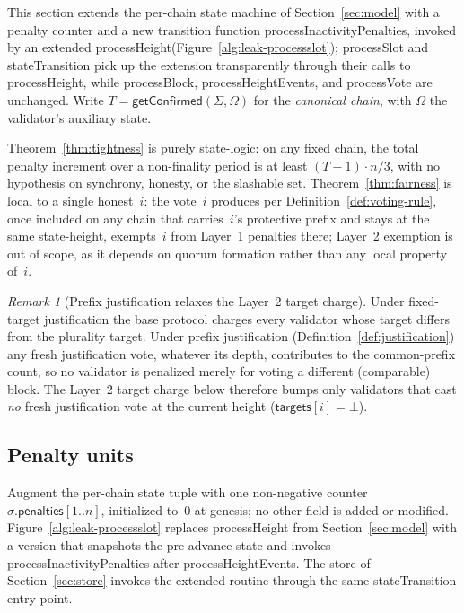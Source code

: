 \ifx\litemode\undefined\documentclass{article}\fi
\newcommand{\targets}{\mathsf{targets}}
\newcommand{\penalties}{\mathsf{penalties}}
\newcommand{\stateTransition}{\textsf{stateTransition}\xspace}
\newcommand{\processSlot}{\textsf{processSlot}\xspace}
\newcommand{\processBlock}{\textsf{processBlock}\xspace}
\newcommand{\processHeight}{\textsf{processHeight}\xspace}
\newcommand{\processHeightEvents}{\textsf{processHeightEvents}\xspace}
\newcommand{\processVote}{\textsf{processVote}\xspace}
\newcommand{\processInactivityPenalties}{\textsf{processInactivityPenalties}\xspace}
\newcommand{\getConfirmed}{\textsf{getConfirmed}\xspace}
\theoremstyle{plain}
\theoremstyle{definition}
\theoremstyle{remark}
\newtheorem{remark}[theorem]{Remark}
\begin{document}
This section extends the per-chain state machine of Section~\ref{sec:model} with a penalty counter and a new transition function \processInactivityPenalties, invoked by an extended \processHeight (Figure~\ref{alg:leak-processslot}); \processSlot and \stateTransition pick up the extension transparently through their calls to \processHeight, while \processBlock, \processHeightEvents, and \processVote are unchanged.
Write $T = \getConfirmed(\Sigma, \Omega)$ for the \emph{canonical chain}, with $\Omega$ the validator's auxiliary state.

Theorem~\ref{thm:tightness} is purely state-logic: on any fixed chain, the total penalty increment over a non-finality period is at least $(T-1) \cdot n/3$, with no hypothesis on synchrony, honesty, or the slashable set.
Theorem~\ref{thm:fairness} is local to a single honest~$i$: the vote~$i$ produces per Definition~\ref{def:voting-rule}, once included on any chain that carries~$i$'s protective prefix and stays at the same state-height, exempts~$i$ from Layer~1 penalties there; Layer~2 exemption is out of scope, as it depends on quorum formation rather than any local property of~$i$.

\begin{remark}[Prefix justification relaxes the Layer~2 target charge]\label{rem:leak-prefix}
Under fixed-target justification the base protocol charges every validator whose target differs from the plurality target.
Under prefix justification (Definition~\ref{def:justification}) any fresh justification vote, whatever its depth, contributes to the common-prefix count, so no validator is penalized merely for voting a different (comparable) block.
The Layer~2 target charge below therefore bumps only validators that cast \emph{no} fresh justification vote at the current height ($\targets[i] = \bot$).
\end{remark}

\subsection{Penalty units}

Augment the per-chain state tuple with one non-negative counter $\sigma.\penalties[1..n]$, initialized to~$0$ at genesis; no other field is added or modified.
Figure~\ref{alg:leak-processslot} replaces \processHeight from Section~\ref{sec:model} with a version that snapshots the pre-advance state and invokes \processInactivityPenalties after \processHeightEvents.
The store of Section~\ref{sec:store} invokes the extended routine through the same \stateTransition entry point.
\end{document}

